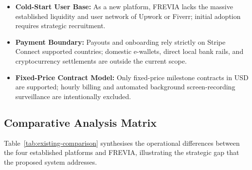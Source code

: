 \begin{itemize}[leftmargin=*]
\begin{itemize}[leftmargin=*]
        \item \textbf{Cold-Start User Base:} As a new platform, FREVIA lacks the massive established liquidity and user network of Upwork or Fiverr; initial adoption requires strategic recruitment.
        \item \textbf{Payment Boundary:} Payouts and onboarding rely strictly on Stripe Connect supported countries; domestic e-wallets, direct local bank rails, and cryptocurrency settlements are outside the current scope.
        \item \textbf{Fixed-Price Contract Model:} Only fixed-price milestone contracts in USD are supported; hourly billing and automated background screen-recording surveillance are intentionally excluded.
    \end{itemize}
\end{itemize}

\subsection{Comparative Analysis Matrix}

Table~\ref{tab:existing-comparison} synthesises the operational differences between the four established platforms and FREVIA, illustrating the strategic gap that the proposed system addresses.

